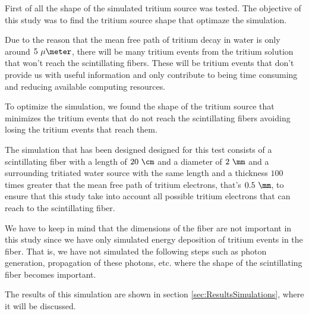 First of all the shape of the simulated tritium source  was tested. The objective of this study was to find the tritium source shape that optimaze the simulation. 

Due to the reason that the mean free path of tritium decay in water is only around $5~\mu\meter$, there will be many tritium events from the tritium solution that won't reach the scintillating fibers. These will be tritium events that don't provide us with useful information and only contribute to being time consuming and reducing available computing resources.

To optimize the simulation, we found the shape of the tritium source that minimizes the tritium events that do not reach the scintillating fibers avoiding losing the tritium events that reach them.

The simulation that has been designed designed for this test consists of a scintillating fiber with a length of $20~\cm$ and a diameter of $2~\mm$ and a surrounding tritiated water source with the same length and a thickness $100$ times greater that the mean free path of tritium electrons, that's $0.5~\mm$, to ensure that this study take into account all possible tritium electrons that can reach to the scintillating fiber. 

We have to keep in mind that the dimensions of the fiber are not important in this study since we have only simulated energy deposition of tritium events in the fiber. That is, we have not simulated the following steps such as photon generation, propagation of these photons, etc. where the shape of the scintillating fiber becomes important.


The results of this simulation are shown in section \ref{sec:ResultsSimulations}, where it will be discussed.
